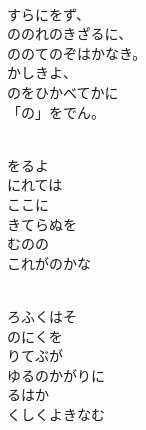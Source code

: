 \documentclass[10pt,b5j]{tarticle} %
\begin{document}
\vspace{1.5em} %
\newcommand{\linespace}{0.5em} %
\newcommand{\blocksize}{0.5\hsize} %
\newcommand{\itemmargin}{3em} %
\begin{enumerate} %
    \setlength{\itemindent}{\itemmargin} %
    \begin{minipage}[c]{\blocksize}
    
        \vspace{\linespace}
        \item~\\
        すらにをず、\\
        ののれのきざるに、\\
        ののてのぞはかなき。\\
        かしきよ、\\
        のをひかべてかに\\
        「の」をでん。
        
    \end{minipage}
    \begin{minipage}[c]{\blocksize}
        
        \vspace{\linespace}
        \item~\\
        をるよ\\
        にれては\\
        ここに\\
        きてらぬを\\
        むのの\\
        これがのかな
        
    \end{minipage}
    \begin{minipage}[c]{\blocksize}
        
        \vspace{\linespace}
        \item~\\
        ろふくはそ\\
        のにくを\\
        りてぶが\\
        ゆるのかがりに\\
        るはか\\
        くしくよきなむ
        

\end{minipage}
\end{enumerate}
\end{document}
